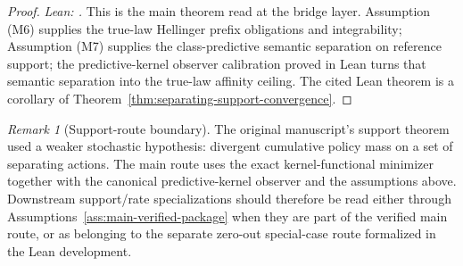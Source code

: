\documentclass[11pt]{article}
\theoremstyle{definition}
\theoremstyle{remark}
\newtheorem{remark}[theorem]{Remark}
\theoremstyle{plain}
\theoremstyle{definition}
\begin{document}
\begin{proof}
\noindent\emph{Lean: .}
This is the main theorem read at the bridge layer. Assumption \textup{(M6)} supplies the true-law Hellinger prefix obligations and integrability; Assumption \textup{(M7)} supplies the class-predictive semantic separation on reference support; the predictive-kernel observer calibration proved in Lean turns that semantic separation into the true-law affinity ceiling. The cited Lean theorem is a corollary of Theorem~\ref{thm:separating-support-convergence}.
\end{proof}

\begin{remark}[Support-route boundary]
\label{rem:h6-support-boundary}
The original manuscript's support theorem used a weaker stochastic hypothesis:
divergent cumulative policy mass on a set of separating actions. The main route uses the exact kernel-functional minimizer together with the
canonical predictive-kernel observer and the assumptions above.
Downstream support/rate specializations should therefore be read either through
Assumptions~\ref{ass:main-verified-package} when they are part of the verified
main route, or as belonging to the separate zero-out special-case route formalized in the Lean development.
\end{remark}
\end{document}
